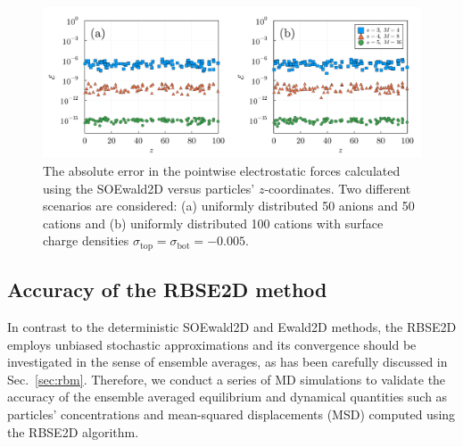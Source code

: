 \begin{figure}[ht]
	\centering
	\includegraphics[width=\textwidth]{figs/fig_error_ef.pdf} 
	\caption{
		The absolute error in the pointwise electrostatic forces calculated using the SOEwald2D versus particles' $z$-coordinates. 
		Two different scenarios are considered: (a) uniformly distributed 50 anions and 50 cations and (b) uniformly distributed 100 cations with surface charge densities $\sigma_{\mathrm{top}}= \sigma_{\mathrm{bot}} = -0.005$.
	}\label{fig:error_ef}
\end{figure}

\subsection{Accuracy of the RBSE2D method}\label{subsec::RBSE2D}

In contrast to the deterministic SOEwald2D and Ewald2D methods, the  RBSE2D employs unbiased stochastic approximations and its convergence should be investigated in the sense of ensemble averages, as has been carefully discussed in Sec.~\ref{sec:rbm}. 
Therefore, we conduct a series of MD simulations to validate the accuracy of the ensemble averaged equilibrium and dynamical quantities such as particles' concentrations and  mean-squared displacements (MSD) computed using the RBSE2D algorithm.

